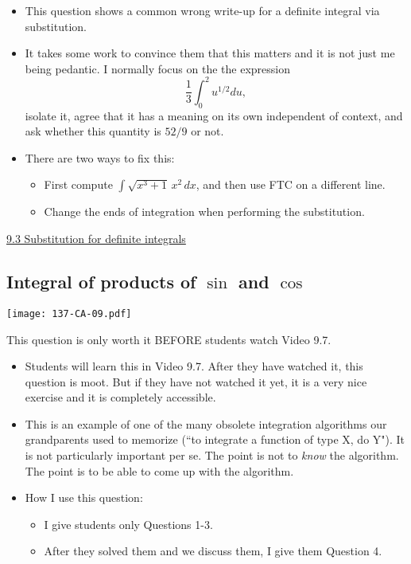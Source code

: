 \documentclass[11pt]{article}
\newcommand {\DS} [1] {${\displaystyle #1}$}
\newcommand{\nl}{\hfill \vspace{-1.1\baselineskip}} %
\newcommand{\viii}{\hspace{8mm} \href{https://www.youtube.com/watch?v=9WkYb_fRoG0&list=PLlwePzQY_wW_DPAQSBjQmMs0hF8T7yVkF&index=3}{9.3 Substitution for definite integrals}}
\begin{document}
\begin{comments}
\nl
	\begin{itemize}
		\item This question shows a common wrong write-up for a definite integral via substitution.    
		\item It takes some work to convince them that this matters and it is not just me being pedantic.  I normally focus on the the expression 
			$$\frac{1}{3} \int_0^2 u^{1/2} du,$$
			 isolate it, agree that it has a meaning on its own independent of context, and ask whether this quantity is \DS{52/9} or not.
		\item There are two ways to fix this:
			\begin{itemize}
				\item  First compute \DS{\int \sqrt{x^3+1} \, x^2 \, dx}, and then use FTC on a different line.
				\item   Change the ends of integration when performing the substitution.
			\end{itemize}
	\end{itemize}
\end{comments}

\begin{videos}
\viii
\end{videos}

\newpage
\subsection{Integral of products of $\sin$ and $\cos$}

\begin{center}
{ \texttt{[image: 137-CA-09.pdf]}} 
\end{center}

\begin{warning}
	This question is only worth it BEFORE students watch Video 9.7.
\end{warning}

\begin{comments}
\nl
	\begin{itemize}
		\item Students will learn this in Video 9.7.  After they have watched it, this question is moot.  But if they have not watched it yet, it is a very nice exercise and it is completely accessible.
		\item This is an example of one of the many obsolete integration algorithms our grandparents used to memorize (``to integrate a function of type X, do Y").  It is not particularly important per se.  The point is not to \emph{know} the algorithm.  The point is to be able to come up with the algorithm.	 
		\item How I use this question:
			\begin{itemize}
				\item I give students only Questions 1-3.
				\item After they solved them and we discuss them, I give them Question 4.
			\end{itemize}	
	\end{itemize}
\end{comments}
\end{document}
